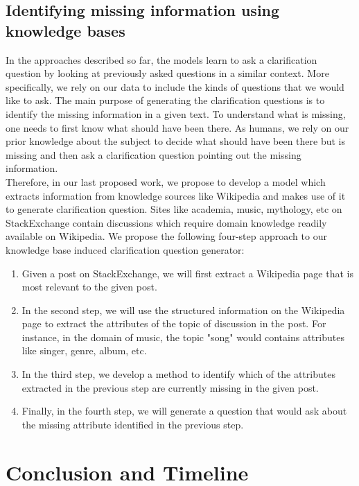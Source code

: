 \documentclass[11pt]{report}
\begin{document}
\newpage
\section{Identifying missing information using knowledge bases}

In the approaches described so far, the models learn to ask a clarification question by looking at previously asked questions in a similar context. More specifically, we rely on our data to include the kinds of questions that we would like to ask. The main purpose of generating the clarification questions is to identify the missing information in a given text. To understand what is missing, one needs to first know what should have been there. As humans, we rely on our prior knowledge about the subject to decide what should have been there but is missing and then ask a clarification question pointing out the missing information. \\

\noindent
Therefore, in our last proposed work, we propose to develop a model which extracts information from knowledge sources like Wikipedia and makes use of it to generate clarification question. Sites like academia, music, mythology, etc on StackExchange contain discussions which require domain knowledge readily available on Wikipedia. We propose the following four-step approach to our knowledge base induced clarification question generator:
\begin{enumerate}
\item Given a post on StackExchange, we will first extract a Wikipedia page that is most relevant to the given post.
\item In the second step, we will use the structured information on the Wikipedia page to extract the attributes of the topic of discussion in the post. For instance, in the domain of music, the topic "song" would contains attributes like singer, genre, album, etc.
\item In the third step, we develop a method to identify which of the attributes extracted in the previous step are currently missing in the given post.
\item Finally, in the fourth step, we will generate a question that would ask about the missing attribute identified in the previous step.
\end{enumerate}


\newpage

\chapter{Conclusion and Timeline}\label{conclusion}
\end{document}
